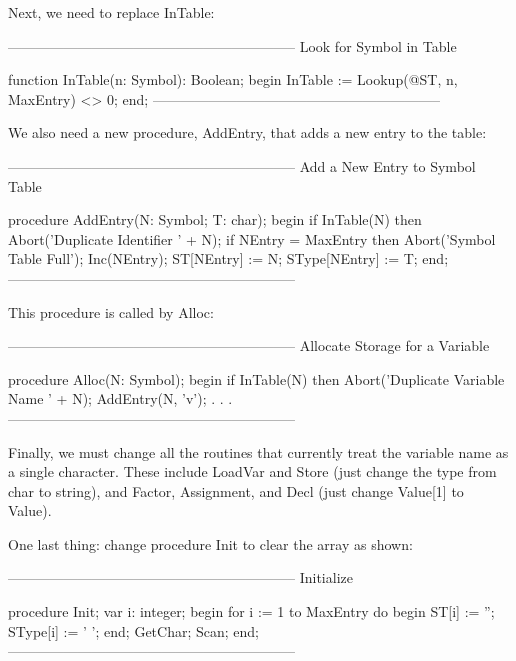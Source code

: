 \documentclass[float=false, crop=false]{standalone}
\begin{document}
Next, we need to replace InTable:

\begin{code}
{--------------------------------------------------------------}
{ Look for Symbol in Table }

function InTable(n: Symbol): Boolean;
begin
   InTable := Lookup(@ST, n, MaxEntry) <> 0;
end;
{--------------------------------------------------------------}
\end{code}

We also need a new procedure, AddEntry, that adds a new entry to the table:

\begin{code}
{--------------------------------------------------------------}
{ Add a New Entry to Symbol Table }

procedure AddEntry(N: Symbol; T: char);
begin
   if InTable(N) then Abort('Duplicate Identifier ' + N);
   if NEntry = MaxEntry then Abort('Symbol Table Full');
   Inc(NEntry);
   ST[NEntry] := N;
   SType[NEntry] := T;
end;
{--------------------------------------------------------------}
\end{code}

This procedure is called by Alloc:

\begin{code}
{--------------------------------------------------------------}
{ Allocate Storage for a Variable }

procedure Alloc(N: Symbol);
begin
   if InTable(N) then Abort('Duplicate Variable Name ' + N);
   AddEntry(N, 'v');
.
.
.
{--------------------------------------------------------------}
\end{code}

Finally, we must change all the routines that currently treat the variable name
as a single character. These include LoadVar and Store (just change the type
from char to string), and Factor, Assignment, and Decl (just change Value[1] to
Value).

One last thing: change procedure Init to clear the array as shown:

\begin{code}
{--------------------------------------------------------------}
{ Initialize }

procedure Init;
var i: integer;
begin
   for i := 1 to MaxEntry do begin
      ST[i] := '';
      SType[i] := ' ';
   end;
   GetChar;
   Scan;
end;
{--------------------------------------------------------------}
\end{code}
\end{document}
